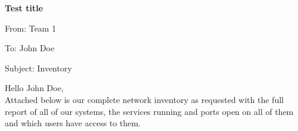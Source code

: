 \documentclass[12]{article}
\renewcommand{\title}[3]{
    \begin{left}
        \Large
        \textbf{#1}

        \vspace{0.4cm}
        \large
        From: #2

        \vspace{0.4cm}
        To: #3

        \vspace{0.4cm}
        Subject: Inventory
    \end{left}
}
\newcommand{\introduction}[1]{
    Hello #1, \\

    Attached below is our complete network inventory as requested with the full report of all of our systems, the services running and ports open on all of them and which users have access to them.
}
\begin{document}
\title{Test title}{Team 1}{John Doe}

\vspace{0.9cm}

\introduction{John Doe}
\end{document}
